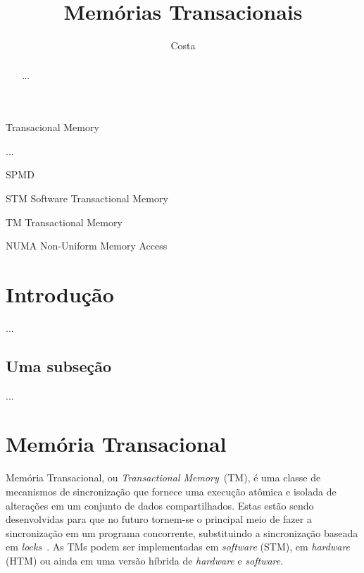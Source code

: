 \documentclass[ti]{texufpel} %
\title{Memórias Transacionais}
\author{Costa}{Michael Alexandre}
\begin{document}
\maketitle

\sloppy

\begin{abstract}
  ...
\end{abstract}

\begin{englishabstract}%
  {Transacional Memory}%

  ...
\end{englishabstract}

\listoffigures

\listoftables

\begin{listofabbrv}{SPMD}
        \item[STM] Software Transactional Memory
        \item[TM] Transactional Memory
        \item[NUMA] Non-Uniform Memory Access
\end{listofabbrv}

\tableofcontents

\chapter{Introdução}

 ...

\section{Uma subseção}

  ...

\chapter{Memória Transacional}

Memória Transacional, ou \emph{Transactional Memory}~(TM), é uma classe de mecanismos de sincronização que fornece uma execução atômica e isolada de alterações em um conjunto de dados compartilhados. Estas estão sendo desenvolvidas para que no futuro tornem-se o principal meio de fazer a sincronização em um programa concorrente, substituindo a sincronização baseada em \emph{locks}~\cite{herlihy06}. As TMs podem ser implementadas em \emph{software} (STM), em \emph{hardware} (HTM) ou ainda em uma versão híbrida de \emph{hardware} e \emph{software}.
\end{document}
